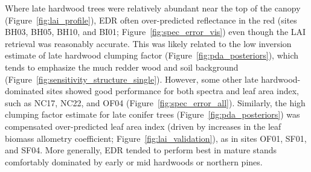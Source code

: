 Where late hardwood trees were relatively abundant near the top of the canopy (Figure~\ref{fig:lai_profile}), EDR often over-predicted reflectance in the red (sites BH03, BH05, BH10, and BI01; Figure~\ref{fig:spec_error_vis}) even though the LAI retrieval was reasonably accurate.
This was likely related to the low inversion estimate of late hardwood clumping factor (Figure~\ref{fig:pda_posteriors}), which tends to emphasize the much redder wood and soil background (Figure~\ref{fig:sensitivity_structure_single}).
However, some other late hardwood-dominated sites showed good performance for both spectra and leaf area index, such as NC17, NC22, and OF04 (Figure~\ref{fig:spec_error_all}).
Similarly, the high clumping factor estimate for late conifer trees (Figure~\ref{fig:pda_posteriors}) was compensated over-predicted leaf area index (driven by increases in the leaf biomass allometry coefficient; Figure~\ref{fig:lai_validation}), as in sites OF01, SF01, and SF04.
More generally, EDR tended to perform best in mature stands comfortably dominated by early or mid hardwoods or northern pines.
